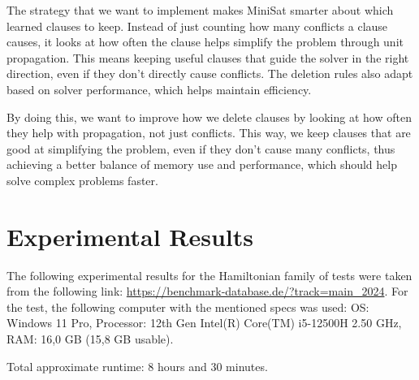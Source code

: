 \documentclass[runningheads]{llncs}
\begin{document}
The strategy that we want to implement makes MiniSat smarter about which learned clauses to keep. Instead of just counting how many conflicts a clause causes, it looks at how often the clause helps simplify the problem through unit propagation. This means keeping useful clauses that guide the solver in the right direction, even if they don't directly cause conflicts. The deletion rules also adapt based on solver performance, which helps maintain efficiency.

By doing this, we want to improve how we delete clauses by looking at how often they help with propagation, not just conflicts. This way, we keep clauses that are good at simplifying the problem, even if they don't cause many conflicts, thus achieving a better balance of memory use and performance, which should help solve complex problems faster.


\newpage

\section{Experimental Results}\label{Experimental Results}

The following experimental results for the Hamiltonian family of tests were taken from the following link: \url{https://benchmark-database.de/?track=main_2024}. For the test, the following computer with the mentioned specs was used: 
OS: Windows 11 Pro,
Processor: 12th Gen Intel(R) Core(TM) i5-12500H 2.50 GHz,
RAM: 16,0 GB (15,8 GB usable).



Total approximate runtime: 8 hours and 30 minutes.



%
%
%
% 
% 
%
\newpage
\end{document}
